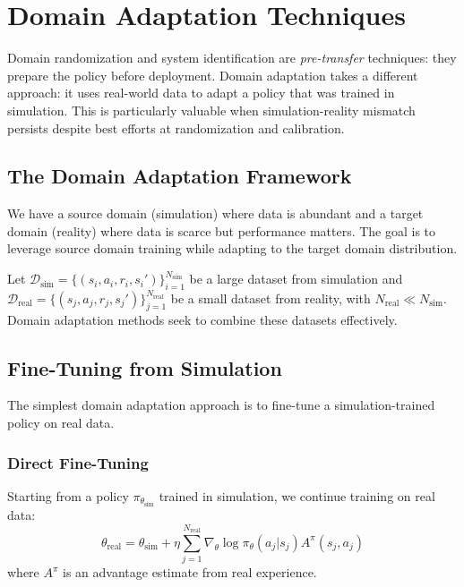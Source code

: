 \section{Domain Adaptation Techniques}
\label{sec:domain_adaptation}

Domain randomization and system identification are \textit{pre-transfer} techniques: they prepare the policy before deployment. Domain adaptation takes a different approach: it uses real-world data to adapt a policy that was trained in simulation. This is particularly valuable when simulation-reality mismatch persists despite best efforts at randomization and calibration.

\subsection{The Domain Adaptation Framework}

We have a source domain (simulation) where data is abundant and a target domain (reality) where data is scarce but performance matters. The goal is to leverage source domain training while adapting to the target domain distribution.

Let $\mathcal{D}_{\text{sim}} = \{(s_i, a_i, r_i, s_i')\}_{i=1}^{N_{\text{sim}}}$ be a large dataset from simulation and $\mathcal{D}_{\text{real}} = \{(s_j, a_j, r_j, s_j')\}_{j=1}^{N_{\text{real}}}$ be a small dataset from reality, with $N_{\text{real}} \ll N_{\text{sim}}$. Domain adaptation methods seek to combine these datasets effectively.

\subsection{Fine-Tuning from Simulation}

The simplest domain adaptation approach is to fine-tune a simulation-trained policy on real data.

\subsubsection{Direct Fine-Tuning}

Starting from a policy $\pi_{\theta_{\text{sim}}}$ trained in simulation, we continue training on real data:
\begin{equation}
\theta_{\text{real}} = \theta_{\text{sim}} + \eta \sum_{j=1}^{N_{\text{real}}} \nabla_\theta \log \pi_\theta(a_j | s_j) A^{\pi}(s_j, a_j)
\end{equation}
where $A^\pi$ is an advantage estimate from real experience.

